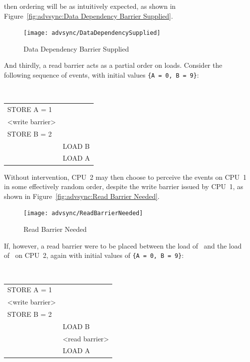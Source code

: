 then ordering will be as intuitively expected, as shown in
Figure~\ref{fig:advsync:Data Dependency Barrier Supplied}.

\begin{figure}[htbp]
\centering
\texttt{[image: advsync/DataDependencySupplied]}
\caption{Data Dependency Barrier Supplied}
\end{figure}

And thirdly, a read barrier acts as a partial order on loads.  Consider the
following sequence of events, with initial values
{\tt \{A~=~0, B~=~9\}}:

\vspace{5pt}
\begin{minipage}[t]{\columnwidth}
\tt
\scriptsize
\begin{tabular}{l|p{1.5in}}
	\nf{CPU 1}	& \nf{CPU 2} \\
	\hline
	STORE A = 1	& \\
	<write barrier>	& \\
	STORE B = 2	& \\
			& LOAD B \\
			& LOAD A \\
\end{tabular}
\end{minipage}
\vspace{5pt}

Without intervention, CPU~2 may then choose to perceive the events on CPU~1 in
some effectively random order, despite the write barrier issued by CPU~1, as
shown in Figure~\ref{fig:advsync:Read Barrier Needed}.

\begin{figure}[htbp]
\centering
\texttt{[image: advsync/ReadBarrierNeeded]}
\caption{Read Barrier Needed}
\end{figure}

If, however, a read barrier were to be placed between the load of~
and the load of~ on CPU~2, again with initial values of
{\tt \{A~=~0, B~=~9\}}:

\vspace{5pt}
\begin{minipage}[t]{\columnwidth}
\tt
\scriptsize
\begin{tabular}{l|p{1.5in}}
	\nf{CPU 1}	& \nf{CPU 2} \\
	\hline
	STORE A = 1	& \\
	<write barrier>	& \\
	STORE B = 2	& \\
			& LOAD B \\
			& <read barrier> \\
			& LOAD A \\
\end{tabular}
\end{minipage}
\vspace{5pt}

